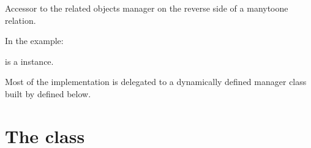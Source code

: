 \documentclass[letterpaper,10pt,english]{sphinxmanual}
\begin{document}
\begin{fulllineitems}
\begin{fulllineitems}
\label{\detokenize{vtcvlp:vtcuser.models.CustomUser.videolink_set}}
Accessor to the related objects manager on the reverse side of a
many\sphinxhyphen{}to\sphinxhyphen{}one relation.

In the example:

\begin{sphinxVerbatim}[commandchars=\\\{\}]
 
       
\end{sphinxVerbatim}

 is a  instance.

Most of the implementation is delegated to a dynamically defined manager
class built by  defined below.

\end{fulllineitems}


\end{fulllineitems}



\section{The  class}
\label{\detokenize{vtcvlp:the-videolink-class}}
\end{document}
